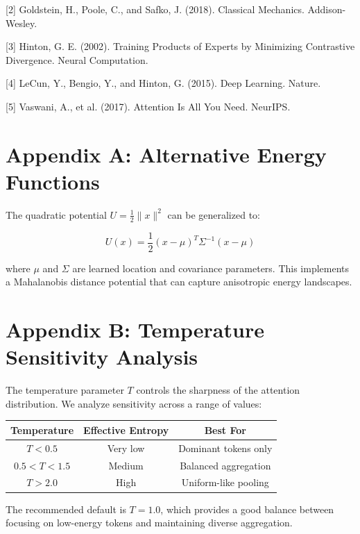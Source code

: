 \documentclass[12pt]{article}
\begin{document}
[2] Goldstein, H., Poole, C., and Safko, J. (2018). Classical Mechanics. Addison-Wesley.

[3] Hinton, G. E. (2002). Training Products of Experts by Minimizing Contrastive Divergence. Neural Computation.

[4] LeCun, Y., Bengio, Y., and Hinton, G. (2015). Deep Learning. Nature.

[5] Vaswani, A., et al. (2017). Attention Is All You Need. NeurIPS.

\appendix

\section*{Appendix A: Alternative Energy Functions}

The quadratic potential $U = \frac{1}{2}\|x\|^2$ can be generalized to:

\begin{equation}
U(x) = \frac{1}{2} (x - \mu)^T \Sigma^{-1} (x - \mu)
\end{equation}

where $\mu$ and $\Sigma$ are learned location and covariance parameters. This implements a Mahalanobis distance potential that can capture anisotropic energy landscapes.

\section*{Appendix B: Temperature Sensitivity Analysis}

The temperature parameter $T$ controls the sharpness of the attention distribution. We analyze sensitivity across a range of values:

\begin{center}
\begin{tabular}{|c|c|c|}
\hline
\textbf{Temperature} & \textbf{Effective Entropy} & \textbf{Best For} \\
\hline
$T < 0.5$ & Very low & Dominant tokens only \\
$0.5 < T < 1.5$ & Medium & Balanced aggregation \\
$T > 2.0$ & High & Uniform-like pooling \\
\hline
\end{tabular}
\end{center}

The recommended default is $T=1.0$, which provides a good balance between focusing on low-energy tokens and maintaining diverse aggregation.
\end{document}
